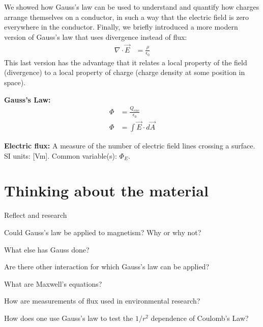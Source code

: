 \begin{chapterSummary}
\begin{enumerate}
\end{enumerate}
We showed how Gauss's law can be used to understand and quantify how charges arrange themselves on a conductor, in such a way that the electric field is zero everywhere in the conductor. Finally, we briefly introduced a more modern version of Gauss's law that uses divergence instead of flux:
\begin{align*}
\nabla \cdot \vec E &= \frac{\rho}{\epsilon_0}
\end{align*}
This last version has the advantage that it relates a local property of the field (divergence) to a local property of charge (charge density at some position in space). 
\end{chapterSummary}

\begin{importantEquations}
\medskip
\begin{multicols}{2}
\textbf{Gauss's Law:}
\begin{align*}
\Phi & = \frac{Q_{enc}}{\epsilon_0}\\
\Phi &= \int \vec E \cdot d \vec A
\end{align*}
\columnbreak

\end{multicols}
\end{importantEquations}


\begin{definitions}
\item	\textbf{Electric flux:} A measure of the number of electric field lines crossing a surface. SI units: [\si{Vm}]. Common variable(s): $\Phi_E$.
\end{definitions}


\newpage
\section{Thinking about the material}

\begin{chapteractivity}{Reflect and research}
{
\item Could Gauss's law be applied to magnetism? Why or why not?
\item What else has Gauss done?
\item Are there other interaction for which Gauss's law can be applied?
\item What are Maxwell's equations? 
\item How are measurements of flux used in environmental research?
\item How does one use Gauss's law to test the $1/r^2$ dependence of Coulomb's Law?
}
\end{chapteractivity}


